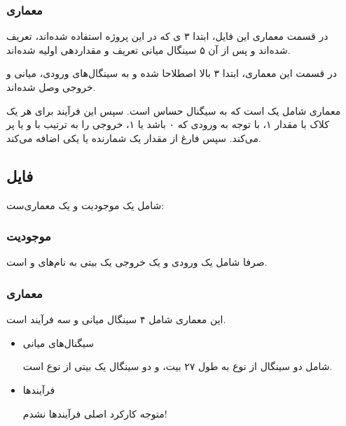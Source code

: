 \documentclass[dvipsnames, svgnames, x11names, a4paper, 11pt]{article}
\begin{document}
\subsubsection{معماری }
در قسمت معماری این فایل، ابتدا ۳ 
ی 
که در این پروژه استفاده شده‌اند، تعریف شده‌اند و پس از آن ۵ سینگال میانی تعریف و مقداردهی اولیه شده‌اند.
 
در قسمت  این معماری، ابتدا ۳  بالا اصطلاحا 
شده و به سینگال‌های ورودی، میانی و خروجی وصل شده‌اند.

معماری شامل یک  است که به سیگنال 
حساس است. سپس این فرآیند برای هر یک کلاک با مقدار ۱، با توجه به ورودی  که ۰ باشد یا ۱، خروجی را به ترتیب با 
و یا
پر می‌کند. سپس فارغ از مقدار  یک شمارنده یا یکی اضافه می‌کند.
\subsection{فایل }
شامل یک موجودیت و یک معماری‌ست:
\subsubsection{موجودیت }
صرفا شامل یک ورودی و یک خروجی یک بیتی به نام‌های 
و 
است.

\subsubsection{معماری }
این معماری شامل ۴ سینگال میانی و سه فرآیند است.

\begin{itemize}
\item 
سیگنال‌های میانی

شامل دو سینگال از نوع
به طول ۲۷ بیت، و دو سینگال یک بیتی از نوع 
است.

\item 
فرآیند‌ها

متوجه کارکرد اصلی فرآیند‌ها نشدم!
\end{itemize}
\end{document}
